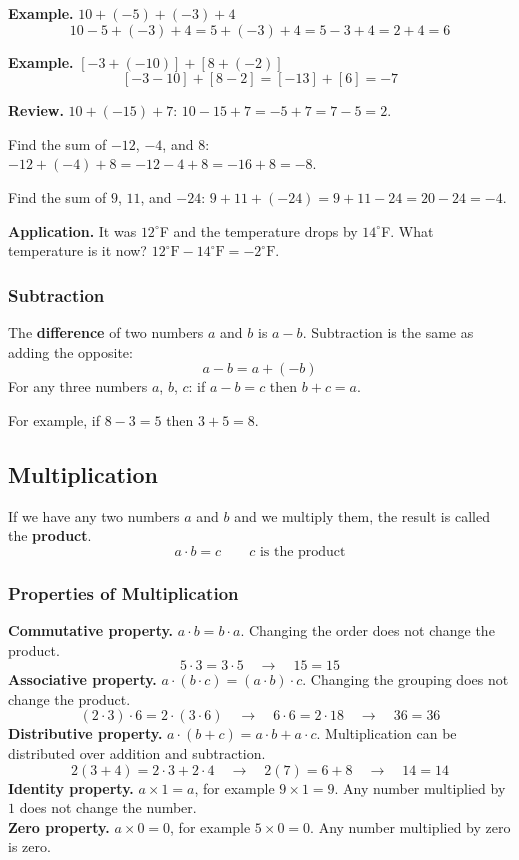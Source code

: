 \documentclass[letter]{article}
\newenvironment{keybox}
  {\begin{lrbox}{\keyboxsave}\begin{minipage}{\dimexpr\linewidth-2\fboxsep-2\fboxrule\relax}}
  {\end{minipage}\end{lrbox}\par\noindent\fbox{\usebox{\keyboxsave}}\par}
\begin{document}
\textbf{Example.} $10+(-5)+(-3)+4$
\[10-5+(-3)+4=5+(-3)+4=5-3+4=2+4=6\]

\textbf{Example.} $[-3+(-10)]+[8+(-2)]$
\[[-3-10]+[8-2]=[-13]+[6]=-7\]

\textbf{Review.} $10+(-15)+7$: $10-15+7=-5+7=7-5=2$.

Find the sum of $-12$, $-4$, and $8$: $-12+(-4)+8=-12-4+8=-16+8=-8$.

Find the sum of $9$, $11$, and $-24$: $9+11+(-24)=9+11-24=20-24=-4$.

\textbf{Application.} It was $12^\circ$F and the temperature drops by $14^\circ$F. What temperature is it now? $12^\circ\text{F}-14^\circ\text{F}=-2^\circ\text{F}$.

\subsubsection*{Subtraction}

\begin{keybox}
The \textbf{difference} of two numbers $a$ and $b$ is $a-b$. Subtraction is the same as adding the opposite:
\[a-b=a+(-b)\]
For any three numbers $a$, $b$, $c$: if $a-b=c$ then $b+c=a$.
\end{keybox}

For example, if $8-3=5$ then $3+5=8$.

\subsection{Multiplication}

If we have any two numbers $a$ and $b$ and we multiply them, the result is called the \textbf{product}.
\[a\cdot b=c\qquad c\text{ is the product}\]

\subsubsection*{Properties of Multiplication}

\begin{keybox}
\textbf{Commutative property.} $a\cdot b=b\cdot a$. Changing the order does not change the product.
\[5\cdot3=3\cdot5\quad\to\quad15=15\]
\textbf{Associative property.} $a\cdot(b\cdot c)=(a\cdot b)\cdot c$. Changing the grouping does not change the product.
\[(2\cdot3)\cdot6=2\cdot(3\cdot6)\quad\to\quad6\cdot6=2\cdot18\quad\to\quad36=36\]
\textbf{Distributive property.} $a\cdot(b+c)=a\cdot b+a\cdot c$. Multiplication can be distributed over addition and subtraction.
\[2(3+4)=2\cdot3+2\cdot4\quad\to\quad2(7)=6+8\quad\to\quad14=14\]
\textbf{Identity property.} $a\times1=a$, for example $9\times1=9$. Any number multiplied by $1$ does not change the number.\\[4pt]
\textbf{Zero property.} $a\times0=0$, for example $5\times0=0$. Any number multiplied by zero is zero.
\end{keybox}
\end{document}
